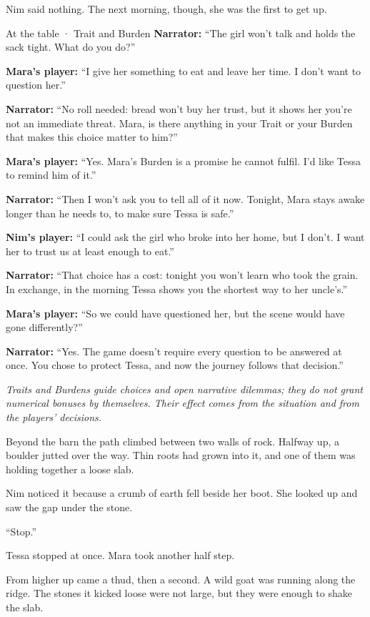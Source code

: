 \documentclass[10pt,a4paper]{article}
\begin{document}
Nim said nothing. The next morning, though, she was the first to get up.
\begin{rpgexample}{At the table · Trait and Burden}
\textbf{Narrator:} “The girl won't talk and holds the sack tight. What do you do?”

\textbf{Mara's player:} “I give her something to eat and leave her time. I don't want to question her.”

\textbf{Narrator:} “No roll needed: bread won't buy her trust, but it shows her you're not an immediate threat. Mara, is there anything in your Trait or your Burden that makes this choice matter to him?”

\textbf{Mara's player:} “Yes. Mara's Burden is a promise he cannot fulfil. I'd like Tessa to remind him of it.”

\textbf{Narrator:} “Then I won't ask you to tell all of it now. Tonight, Mara stays awake longer than he needs to, to make sure Tessa is safe.”

\textbf{Nim's player:} “I could ask the girl who broke into her home, but I don't. I want her to trust us at least enough to eat.”

\textbf{Narrator:} “That choice has a cost: tonight you won't learn who took the grain. In exchange, in the morning Tessa shows you the shortest way to her uncle's.”

\textbf{Mara's player:} “So we could have questioned her, but the scene would have gone differently?”

\textbf{Narrator:} “Yes. The game doesn't require every question to be answered at once. You chose to protect Tessa, and now the journey follows that decision.”

\emph{Traits and Burdens guide choices and open narrative dilemmas; they do not grant numerical bonuses by themselves. Their effect comes from the situation and from the players' decisions.}

\end{rpgexample}
Beyond the barn the path climbed between two walls of rock. Halfway up, a boulder jutted over the way. Thin roots had grown into it, and one of them was holding together a loose slab.

Nim noticed it because a crumb of earth fell beside her boot. She looked up and saw the gap under the stone.

“Stop.”

Tessa stopped at once. Mara took another half step.

From higher up came a thud, then a second. A wild goat was running along the ridge. The stones it kicked loose were not large, but they were enough to shake the slab.
\end{document}
